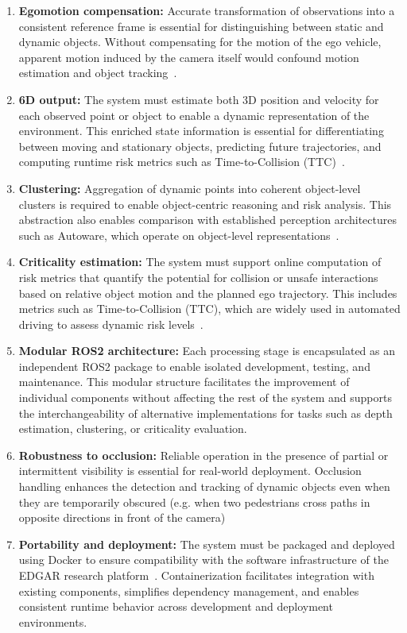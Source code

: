 \begin{enumerate}
  \item \textbf{Egomotion compensation:} Accurate transformation of observations
    into a consistent reference frame is essential for distinguishing between
    static and dynamic objects. Without compensating for the motion of the ego
    vehicle, apparent motion induced by the camera itself would confound motion
    estimation and object tracking~\cite{6d_vision_detailed}.
  \item \textbf{6D output:} The system must estimate both 3D position and
    velocity for each observed point or object to enable a dynamic representation
    of the environment. This enriched state information is essential for
    differentiating between moving and stationary objects, predicting future
    trajectories, and computing runtime risk metrics such as Time-to-Collision
    (TTC)~\cite{cricitality_metrics}.
    \item \textbf{Clustering:} Aggregation of dynamic points into coherent
  object-level clusters is required to enable object-centric reasoning and
  risk analysis. This abstraction also enables comparison with established
  perception architectures such as Autoware, which operate on object-level
  representations~\cite{autowarefoundationPerceptionComponent}.
  \item \textbf{Criticality estimation:} The system must support online
computation of risk metrics that quantify the potential for collision or unsafe
interactions based on relative object motion and the planned ego trajectory.
This includes metrics such as Time-to-Collision (TTC), which are widely used in
automated driving to assess dynamic risk levels~\cite{cricitality_metrics}.
  \item \textbf{Modular ROS2 architecture:} Each processing stage is encapsulated
as an independent ROS2 package to enable isolated development, testing, and
maintenance. This modular structure facilitates the improvement of individual
components without affecting the rest of the system and supports the
interchangeability of alternative implementations for tasks such as depth
estimation, clustering, or criticality evaluation.

  \item \textbf{Robustness to occlusion:} Reliable operation in the presence of
partial or intermittent visibility is essential for real-world deployment.
Occlusion handling enhances the detection and tracking of dynamic objects even
when they are temporarily obscured (e.g. when two pedestrians cross
paths in opposite directions in front of the camera)

  \item \textbf{Portability and deployment:} The system must be packaged and
deployed using Docker to ensure compatibility with the software infrastructure
of the EDGAR research platform~\cite{edgar_hardware}. Containerization facilitates integration with
existing components, simplifies dependency management, and enables consistent
runtime behavior across development and deployment environments.

\end{enumerate}

